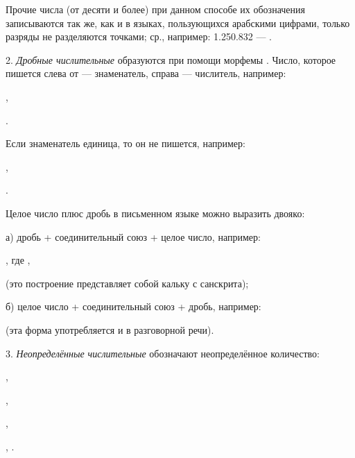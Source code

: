 Прочие числа (от десяти и более) при данном способе их обозначения записываются так же, как и в языках, пользующихся арабскими цифрами, только разряды не разделяются точками; ср., например: 1.250.832 --- .

2. \emph{Дробные числительные} образуются при помощи морфемы . Число, которое пишется слева от  --- знаменатель, справа --- числитель, например:
\begin{prfsample}
    \item {},
    \item {}.
\end{prfsample}
Если знаменатель единица, то он не пишется, например:
\begin{prfsample}
    \item {},
    \item {}.
\end{prfsample}

Целое число плюс дробь в письменном языке можно выразить двояко:
\begin{description}
    \item а) дробь + соединительный союз  + целое число, например:
    \begin{prfsample}
        \item {}, где	, 
    \end{prfsample}
    (это построение представляет собой кальку с санскрита);
    \item б) целое число + соединительный союз + дробь, например:
    \begin{prfsample}
        \item {}
    \end{prfsample}
    (эта форма употребляется и в разговорной речи).
\end{description}

3. \emph{Неопределённые числительные} обозначают неопределённое количество:
\begin{prfsample}
    \item {},
    \item {},
    \item {},
    \item {}, .
\end{prfsample}

